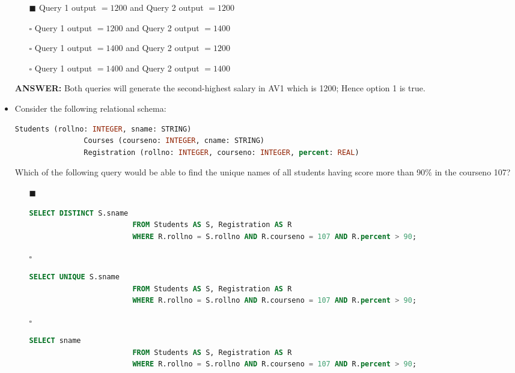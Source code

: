\documentclass[10pt]{article}
\begin{document}
\begin{itemize}
			\begin{enumerate}
				\item[$\blacksquare$] Query 1 output $= 1200$ and Query 2 output $= 1200$
				\item[$\square$] Query 1 output $= 1200$ and Query 2 output $= 1400$
				\item[$\square$] Query 1 output $= 1400$ and Query 2 output $= 1200$
				\item[$\square$] Query 1 output $= 1400$ and Query 2 output $= 1400$
			\end{enumerate}
			\color{red} \textbf{ANSWER:} \color{black} Both queries will generate the second-highest salary in AV1 which is 1200; Hence option 1 is true.

		\newpage

		\item Consider the following relational schema:
			\begin{lstlisting}[language=SQL,firstline=1, lastline=3] 
				Students (rollno: INTEGER, sname: STRING)
				Courses (courseno: INTEGER, cname: STRING)
				Registration (rollno: INTEGER, courseno: INTEGER, percent: REAL)
			\end{lstlisting}
			Which of the following query would be able to find the unique names of all students having score more than 90$\%$ in the courseno 107?
			\begin{enumerate}
				\item[$\blacksquare$] 
					\begin{lstlisting}[language=SQL,firstline=1, lastline=3, numbers = right] 
						SELECT DISTINCT S.sname 
						FROM Students AS S, Registration AS R 
						WHERE R.rollno = S.rollno AND R.courseno = 107 AND R.percent > 90;
					\end{lstlisting}
				
				\item[$\square$] 
					\begin{lstlisting}[language=SQL,firstline=1, lastline=3, numbers = right] 
						SELECT UNIQUE S.sname 
						FROM Students AS S, Registration AS R 
						WHERE R.rollno = S.rollno AND R.courseno = 107 AND R.percent > 90;
					\end{lstlisting}
				
				\item[$\square$] 
					\begin{lstlisting}[language=SQL,firstline=1, lastline=3, numbers = right] 
						SELECT sname 
						FROM Students AS S, Registration AS R 
						WHERE R.rollno = S.rollno AND R.courseno = 107 AND R.percent > 90;
					\end{lstlisting}
				

\end{enumerate}
\end{itemize}
\end{document}
